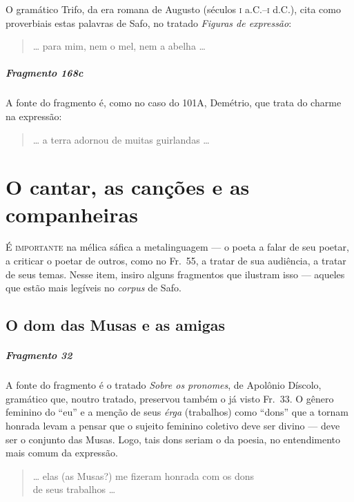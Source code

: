{\small O gramático Trifo, da era romana de Augusto (séculos \textsc{i} a.C.--\textsc{i} d.C.), 
cita como proverbiais estas palavras de Safo, no tratado \textit{Figuras de expressão}:}

\begin{verse}
\ldots{} para mim, nem o mel, nem a abelha \ldots{}
\end{verse}

\paragraph{Fragmento 168c}

{\small A fonte do fragmento é, como no caso do 101A, Demétrio, que trata do charme na
expressão:}

\begin{verse}
\ldots{} a terra adornou de muitas guirlandas \ldots{}
\end{verse}


\chapter[O cantar, as canções e as companheiras]{O cantar, as canções e as companheiras}

\textsc{É importante} na mélica sáfica a metalinguagem --- o poeta a falar de seu
poetar, a criticar o poetar de outros, como no Fr.~55, a tratar de sua
audiência, a tratar de seus temas. Nesse item, insiro alguns fragmentos que
ilustram isso --- aqueles que estão mais legíveis no \textit{corpus} de Safo.

\section{O dom das Musas e as amigas}

\paragraph{Fragmento 32}

{\small A fonte do fragmento é o tratado \textit{Sobre os pronomes}, de Apolônio
Díscolo, gramático que, noutro tratado, preservou também o já visto Fr.~33. O
gênero feminino do “eu” e a menção de seus \textit{érga }(trabalhos) como
``dons” que a tornam honrada levam a pensar que o sujeito feminino
coletivo deve ser divino --- deve ser o conjunto das Musas. Logo, tais dons
seriam o da poesia, no entendimento mais comum da expressão.}

\begin{verse}
\ldots{} elas (as Musas?) me fizeram honrada com os dons\\
de seus trabalhos \ldots{}
\end{verse}

